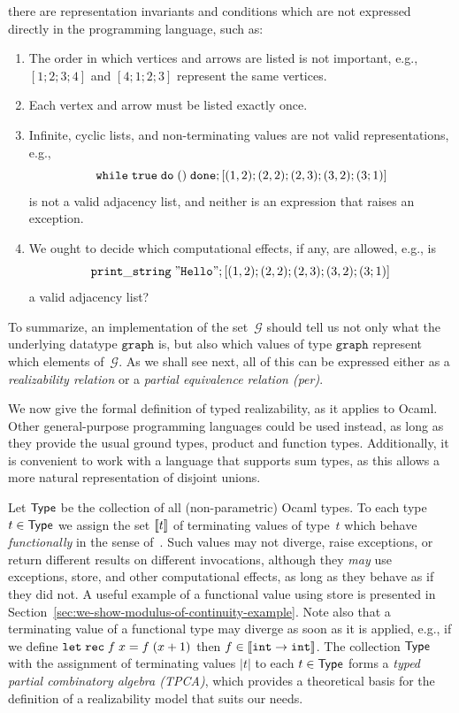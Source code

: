 there are representation invariants and conditions which are not
expressed directly in the programming language, such as:
%
\begin{enumerate}
\item The order in which vertices and arrows are listed is not
  important, e.g., $[1;2;3;4]$ and $[4;1;2;3]$ represent the same vertices.
\item Each vertex and arrow must be listed exactly once.
\item Infinite, cyclic lists, and non-terminating values are not valid
  representations, e.g.,
  \begin{equation*}
    \mathtt{while}\;\mathtt{true}\;\mathtt{do}\;()\;\mathtt{done}; [(1,2);(2,2);(2,3);(3,2);(3;1)]
  \end{equation*}
  is not a valid adjacency list, and neither is an expression that
  raises an exception.
\item We ought to decide which computational effects, if any, are
  allowed, e.g., is
  \begin{equation*}
    \mathtt{print\_string}\;\mathtt{"Hello"}; [(1,2);(2,2);(2,3);(3,2);(3;1)]
  \end{equation*}
  a valid adjacency list?
\end{enumerate}
%
To summarize, an implementation of the set~$\mathcal{G}$ should tell
us not only what the underlying datatype $\mathtt{graph}$ is, but also
which values of type $\mathtt{graph}$ represent which elements
of~$\mathcal{G}$. As we shall see next, all of this can be expressed
either as a \emph{realizability relation} or a \emph{partial
  equivalence relation (per)}.

We now give the formal definition of typed realizability, as it
applies to Ocaml. Other general-purpose programming languages could be
used instead, as long as they provide the usual ground types, product
and function types. Additionally, it is convenient to work with a
language that supports sum types, as this allows a more natural
representation of disjoint unions.

Let $\mathsf{Type}$ be the collection of all (non-parametric) Ocaml types. To
each type $t \in \mathsf{Type}$ we assign the set $[\![t]\!]$ of
terminating values of type~$t$ which behave \emph{functionally} in the
sense of~\cite{longley99when}. Such values may not diverge, raise
exceptions, or return different results on different invocations,
although they \emph{may} use exceptions, store, and other
computational effects, as long as they behave as if they did not. A
useful example of a functional value using store is presented in
Section~\ref{sec:we-show-modulus-of-continuity-example}. Note also
that a terminating value of a functional type may diverge as soon as
it is applied, e.g., if we define $\mathtt{let}\;\mathtt{rec}\;f\;x = f\;(x+1)$ then $f
\in [\![\mathtt{int} \to \mathtt{int}]\!]$. The collection $\mathsf{Type}$ with the
assignment of terminating values $|t|$ to each $t \in \mathsf{Type}$ forms a
\emph{typed partial combinatory algebra (TPCA)}, which provides a
theoretical basis for the definition of a realizability model that
suits our needs.

